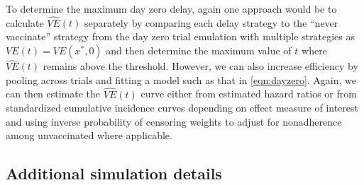 \begin{appendix}
    To determine the maximum day zero delay, again one approach would be to calculate $\widehat{VE}(t)$ separately by comparing each delay strategy to the ``never vaccinate'' strategy from the day zero trial emulation with multiple strategies as $VE(t) = VE(x^*, 0)$ and then determine the maximum value of $t$ where  $\widehat{VE}(t)$ remains above the threshold. However,  we can also increase efficiency by pooling across trials and fitting a model such as that in \ref{eqn:dayzero}. Again, we can then estimate the $\widehat{VE}(t)$ curve either from estimated hazard ratios or from standardized cumulative incidence curves depending on effect measure of interest and using inverse probability of censoring weights to adjust for nonadherence among unvaccinated where applicable.
    

    

    
    \subsection{Additional simulation details}
    

\end{appendix}
